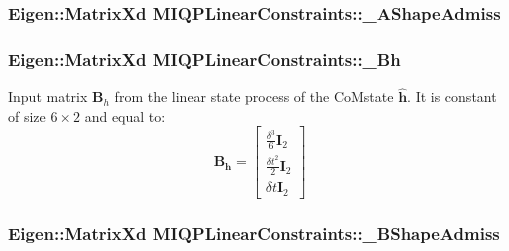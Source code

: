 \hypertarget{classMIQPLinearConstraints_a7ff7b3584cf9ff3e2124d80bd0684180}{
\subsubsection[{\-\_\-\-A\-Shape\-Admiss}]{\setlength{\rightskip}{0pt plus 5cm}\-Eigen\-::\-Matrix\-Xd {\bf \-M\-I\-Q\-P\-Linear\-Constraints\-::\-\_\-\-A\-Shape\-Admiss}}}\label{classMIQPLinearConstraints_a7ff7b3584cf9ff3e2124d80bd0684180}
\hypertarget{classMIQPLinearConstraints_a0c0fbbb1b86c5d51a133ee661977c1f5}{
\subsubsection[{\-\_\-\-Bh}]{\setlength{\rightskip}{0pt plus 5cm}\-Eigen\-::\-Matrix\-Xd {\bf \-M\-I\-Q\-P\-Linear\-Constraints\-::\-\_\-\-Bh}}}\label{classMIQPLinearConstraints_a0c0fbbb1b86c5d51a133ee661977c1f5}
\-Input matrix $\mathbf{B}_h$ from the linear state process of the \-Co\-Mstate $\hat{\mathbf{h}}$. \-It is constant of size $6\times2$ and equal to\-: \[ \mathbf{B_h} = \left[ \begin{array}{c} \frac{\delta^3}{6}\mathbf{I}_2 \\ \frac{\delta t^2}{2} \mathbf{I}_2 \\ \delta t \mathbf{I}_2 \end{array} \right] \] \hypertarget{classMIQPLinearConstraints_ab3ea8be40c22fa7d8035c7b5c5c1010c}{
\subsubsection[{\-\_\-\-B\-Shape\-Admiss}]{\setlength{\rightskip}{0pt plus 5cm}\-Eigen\-::\-Matrix\-Xd {\bf \-M\-I\-Q\-P\-Linear\-Constraints\-::\-\_\-\-B\-Shape\-Admiss}}}\label{classMIQPLinearConstraints_ab3ea8be40c22fa7d8035c7b5c5c1010c}
